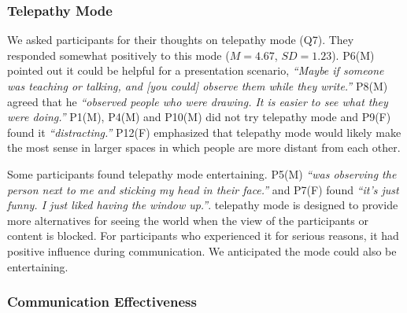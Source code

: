 \documentclass[chi_draft]{sigchi}
\begin{document}

\subsubsection{Telepathy Mode}
We asked participants for their thoughts on telepathy mode (Q7). They responded somewhat positively to this mode ($M=4.67$, $SD=1.23$). P6(M) pointed out it could be helpful for a presentation scenario, \textit{``Maybe if someone was teaching or talking, and [you could] observe them while they write.''} P8(M) agreed that he \textit{``observed people who were drawing. It is easier to see what they were doing.''} P1(M), P4(M) and P10(M) did not try telepathy mode and P9(F) found it \textit{``distracting.''} 
P12(F) emphasized that telepathy mode would likely make the most sense in larger spaces in which people are more distant from each other.

Some participants found telepathy mode entertaining. P5(M) \textit{``was observing the person next to me and sticking my head in their face.''} and P7(F) found \textit{``it's just funny. I just liked having the window up.''}. telepathy mode is designed to provide more alternatives for seeing the world when the view of the participants or content is blocked. For participants who experienced it for serious reasons, it had positive influence during communication. We anticipated the mode could also be entertaining.

\subsubsection{Communication Effectiveness}
\end{document}
